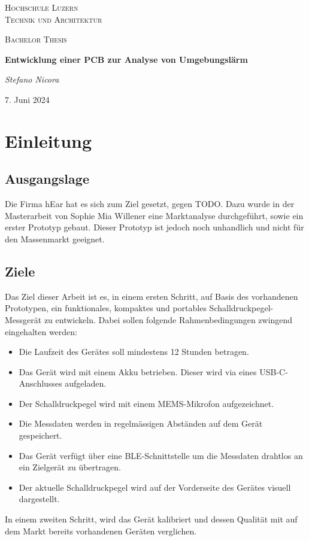 \documentclass[12pt]{article}
\begin{document}
	\begin{titlepage}
		\centering
		\vspace{1cm}
		{\scshape\LARGE Hochschule Luzern \\ Technik und Architektur \par}
		\vspace{1cm}
		{\scshape\Large Bachelor Thesis\par}
		\vspace{1.5cm}
		{\huge\bfseries Entwicklung einer PCB zur Analyse von Umgebungslärm\par}
		\vspace{2cm}
		{\Large\itshape Stefano Nicora\par}
		
		\vfill
		
		{\large 7. Juni 2024\par}
	\end{titlepage}
	\tableofcontents
	
	
	\newpage
	\section{Einleitung}
	\subsection{Ausgangslage}
	Die Firma hEar hat es sich zum Ziel gesetzt, gegen \color{red}TODO\color{black}. Dazu wurde in der Masterarbeit von Sophie Mia Willener eine Marktanalyse durchgeführt, sowie ein erster Prototyp gebaut. Dieser Prototyp ist jedoch noch unhandlich und nicht für den Massenmarkt geeignet. 
	\subsection{Ziele}
	Das Ziel dieser Arbeit ist es, in einem ersten Schritt, auf Basis des vorhandenen Prototypen, ein funktionales, kompaktes und portables Schalldruckpegel-Messgerät zu entwickeln. Dabei sollen folgende Rahmenbedingungen zwingend eingehalten werden:
	\begin{itemize}
		\item Die Laufzeit des Gerätes soll mindestens 12 Stunden betragen.
		\item Das Gerät wird mit einem Akku betrieben. Dieser wird via eines USB-C-Anschlusses aufgeladen.
		\item Der Schalldruckpegel wird mit einem MEMS-Mikrofon aufgezeichnet.
		\item Die Messdaten werden in regelmässigen Abständen auf dem Gerät gespeichert.
		\item Das Gerät verfügt über eine BLE-Schnittstelle um die Messdaten drahtlos an ein Zielgerät zu übertragen.
		\item Der aktuelle Schalldruckpegel wird auf der Vorderseite des Gerätes visuell dargestellt.
	\end{itemize}
	In einem zweiten Schritt, wird das Gerät kalibriert und dessen Qualität mit auf dem Markt bereits vorhandenen Geräten verglichen.
	
\end{document}
